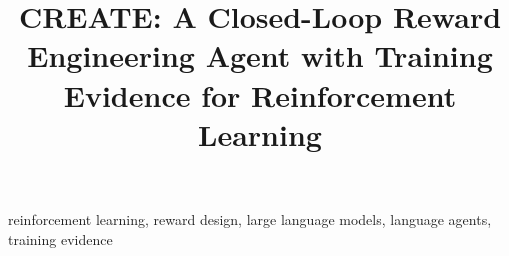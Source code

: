 \documentclass[conference]{IEEEtran}
\begin{document}
\title{CREATE: A Closed-Loop Reward Engineering Agent with Training Evidence for Reinforcement Learning}

\author{
}

\maketitle



\begin{IEEEkeywords}
reinforcement learning, reward design, large language models, language agents, training evidence
\end{IEEEkeywords}










\end{document}
